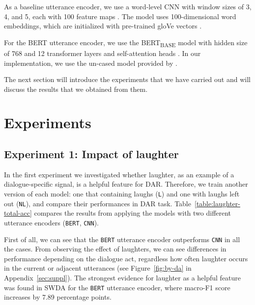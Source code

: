\documentclass[11pt,a4paper]{article}
\begin{document}
As a baseline utterance encoder, we use a word-level CNN with window sizes of 3, 4, and 5, each with 100 feature maps \citep{kimConvolutionalNeuralNetworks2014}. 
The model uses 100-dimensional word embeddings, which are initialized with pre-trained gloVe vectors \citep{penningtonGloveGlobalVectors2014}.

For the BERT utterance encoder, we use the BERT\textsubscript{BASE} model with hidden size of 768 and 12 transformer layers and self-attention heads \citep[][\S3.1]{devlinBERTPretrainingDeep2018}.
In our implementation, we use the un-cased model provided by \citet{wolfHuggingFaceTransformersStateoftheart2019}.

The next section will introduce the experiments that we have carried out and will discuss the results that we obtained from them.


\section{Experiments}
\subsection{Experiment 1: Impact of laughter} \label{sec:experiment1}   %
In the first experiment we investigated whether laughter, as an example of a dialogue-specific signal, is a helpful feature for DAR.
Therefore, we train another version of each model: one that containing laughs (\texttt{L}) and one with laughs left out (\texttt{NL}), and compare their performances in DAR task.
Table~\ref{table:laughter-total-acc} compares the results from applying the models with two different utterance encoders (\texttt{BERT}, \texttt{CNN}).

First of all, we can see that the \texttt{BERT} utterance encoder outperforms \texttt{CNN} in all the cases.
From observing the effect of laughters, we can see differences in performance depending on the dialogue act, regardless how often laughter occurs in the current or adjacent utterances (see Figure~\ref{fig:by-da} in Appendix~\ref{sec:suppl}).
The strongest evidence for laughter as a helpful feature was found in SWDA for the \texttt{BERT} utterance encoder, where macro-F1 score increases by 7.89 percentage points.
\end{document}
